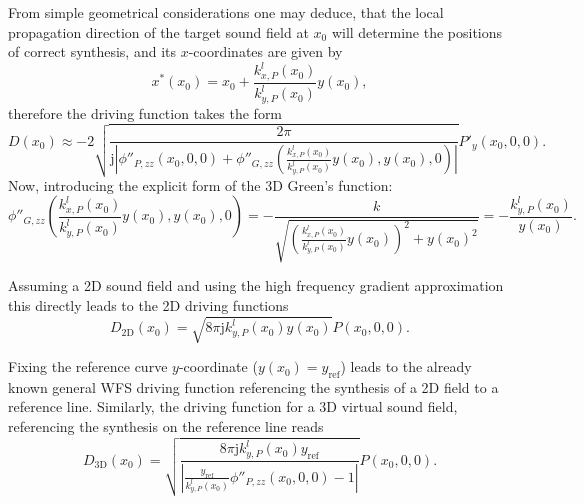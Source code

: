 \documentclass[12pt,a4paper]{article}
\newcommand{\ti}{\mathrm{j}}
\newcommand{\yref}{y_{\mathrm{ref}}}
\begin{document}
From simple geometrical considerations one may deduce, that the local propagation direction of the target sound field at $x_0$ will determine the positions of correct synthesis, and its $x$-coordinates are given by
\begin{equation}
x^*(x_0) = x_0 + \frac{k^l_{x,P}(x_0)}{k^l_{y,P}(x_0)} y(x_0), 
\end{equation}
therefore the driving function takes the form
\begin{equation}
D(x_0) \approx -2
\sqrt{ \frac{2\pi}{\ti \left| \phi''_{P,zz}(x_0,0,0	) + \phi''_{G,zz}(\frac{k^l_{x,P}(x_0)}{k^l_{y,P}(x_0)} y(x_0),y(x_0),0) \right|}}
 P'_y(x_0,0,0).
\end{equation}
Now, introducing the explicit form of the 3D Green's function:
\begin{equation}
\phi''_{G,zz}(\frac{k^l_{x,P}(x_0)}{k^l_{y,P}(x_0)} y(x_0),y(x_0),0) = -\frac{k}{\sqrt{\left( \frac{k^l_{x,P}(x_0)}{k^l_{y,P}(x_0)} y(x_0) \right)^2 + y(x_0)^2}}
= 
-\frac{k^l_{y,P}(x_0)}{y(x_0)}.
\end{equation}

Assuming a 2D sound field and using the high frequency gradient approximation this directly leads to the 2D driving functions
\begin{equation}
D_{2\mathrm{D}}(x_0) = 
\sqrt{ 8\pi \ti k^l_{y,P}(x_0) y(x_0) }
 P(x_0,0,0).
\end{equation}

Fixing the reference curve $y$-coordinate ($y(x_0) = \yref$) leads to the already known general WFS driving function referencing the synthesis of a 2D field to a reference line. Similarly, the driving function for a 3D virtual sound field, referencing the synthesis on the reference line reads
\begin{equation}
D_{3\mathrm{D}}(x_0) = 
\sqrt{ \frac{8\pi \ti k^l_{y,P}(x_0) \yref }{\left| \frac{\yref}{k^l_{y,P}(x_0)}\phi''_{P,zz}(x_0,0,0	) - 1 \right|}} P(x_0,0,0).
\end{equation}
\end{document}
